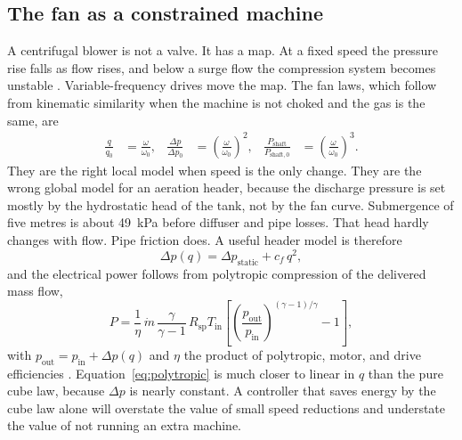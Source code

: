 \subsection{The fan as a constrained machine}

A centrifugal blower is not a valve. It has a map. At a fixed speed the pressure rise falls as flow rises, and below a surge flow the compression system becomes unstable \cite{gravdahl1999surge,dixon2014turbo}. Variable-frequency drives move the map. The fan laws, which follow from kinematic similarity when the machine is not choked and the gas is the same, are
\begin{align}
\frac{q}{q_{0}}
&=
\frac{\omega}{\omega_{0}},
&
\frac{\Delta p}{\Delta p_{0}}
&=
\left(\frac{\omega}{\omega_{0}}\right)^{2},
&
\frac{P_{\mathrm{shaft}}}{P_{\mathrm{shaft},0}}
&=
\left(\frac{\omega}{\omega_{0}}\right)^{3}.
\label{eq:fanlaws}
\end{align}
They are the right local model when speed is the only change. They are the wrong global model for an aeration header, because the discharge pressure is set mostly by the hydrostatic head of the tank, not by the fan curve. Submergence of five metres is about \SI{49}{\kilo\pascal} before diffuser and pipe losses. That head hardly changes with flow. Pipe friction does. A useful header model is therefore
\begin{equation}
\label{eq:header-dp}
\Delta p(q)
=
\Delta p_{\mathrm{static}}
+
c_{f}\,q^{2},
\end{equation}
and the electrical power follows from polytropic compression of the delivered mass flow,
\begin{equation}
\label{eq:polytropic}
P
=
\frac{1}{\eta}
\,
\dot{m}\,
\frac{\gamma}{\gamma-1}\,
R_{\mathrm{sp}} T_{\mathrm{in}}
\left[
\left(\frac{p_{\mathrm{out}}}{p_{\mathrm{in}}}\right)^{(\gamma-1)/\gamma}
-
1
\right],
\end{equation}
with $p_{\mathrm{out}}=p_{\mathrm{in}}+\Delta p(q)$ and $\eta$ the product of polytropic, motor, and drive efficiencies \cite{dixon2014turbo,iec60034}. Equation~\eqref{eq:polytropic} is much closer to linear in $q$ than the pure cube law, because $\Delta p$ is nearly constant. A controller that saves energy by the cube law alone will overstate the value of small speed reductions and understate the value of not running an extra machine.

